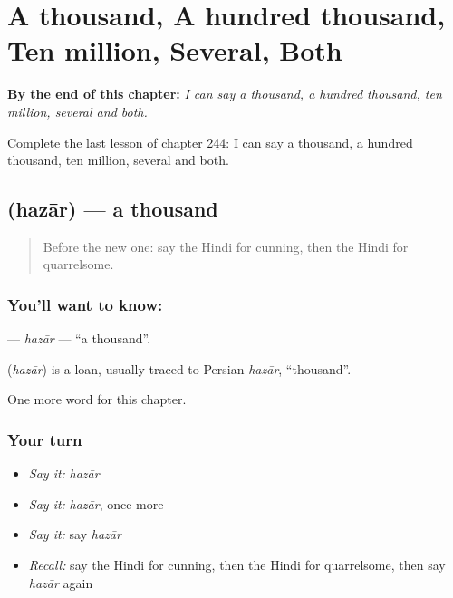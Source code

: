 
\chapter{A thousand, A hundred thousand, Ten million, Several, Both}
\label{ch:hi-a-thousand-a-hundred-thousand-ten-million-several-both}

\begin{chapteropening}
\textbf{By the end of this chapter:} \emph{I can say a thousand, a hundred thousand, ten million, several and both.}

Complete the last lesson of chapter 244: I can say a thousand, a hundred thousand, ten million, several and both.
\end{chapteropening}

\section[\texorpdfstring{\hi{हज़ार} (hazār)}{हज़ार (hazār)}]{ (hazār) — a thousand}

\label{lesson:HI-C244-hazar}



\begin{quote}
Before the new one: say the Hindi for cunning, then the Hindi for quarrelsome.
\end{quote}

\subsection*{You'll want to know: }
\textbf{} — \emph{hazār} — \textquotedblleft{}a thousand\textquotedblright{}.

\begin{cousinweb}
\textbf{} (\emph{hazār}) is a loan, usually traced to Persian \emph{hazār}, \textquotedblleft{}thousand\textquotedblright{}.
\end{cousinweb}

\begin{grammarlens}[title={What you've built}]
One more word for this chapter.
\end{grammarlens}

\subsection*{Your turn}
\begin{itemize}
\raggedright
  \item \emph{Say it:} \emph{hazār}
  \item \emph{Say it:} \emph{hazār}, once more
  \item \emph{Say it:} say \emph{hazār}
  \item \emph{Recall:} say the Hindi for cunning, then the Hindi for quarrelsome, then say \emph{hazār} again
\end{itemize}

